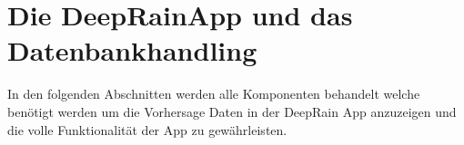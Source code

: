 \section{Die DeepRainApp und das Datenbankhandling}\label{die deeprain app und das datenbankhandling}
In den folgenden Abschnitten werden alle Komponenten behandelt welche benötigt werden um die Vorhersage Daten in der DeepRain App anzuzeigen und die volle Funktionalität der App zu gewährleisten.  





